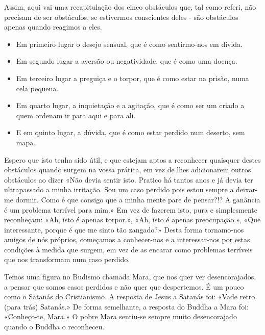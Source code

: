 Assim, aqui vai uma recapitulação dos cinco obstáculos que, tal como
referi, não precisam de ser obstáculos, se estivermos conscientes deles
- são obstáculos apenas quando reagimos a eles.


\begin{itemize}
  \item Em primeiro lugar o desejo sensual, que é como sentirmo-nos em dívida.
  \item Em segundo lugar a aversão ou negatividade, que é como uma doença.
  \item Em terceiro lugar a preguiça e o torpor, que é como estar na prisão, numa cela pequena.
  \item Em quarto lugar, a inquietação e a agitação, que é como ser um criado a quem ordenam ir para aqui e para ali.
  \item E em quinto lugar, a dúvida, que é como estar perdido num deserto, sem mapa.
\end{itemize}

Espero que isto tenha sido útil, e que estejam aptos a reconhecer
quaisquer destes obstáculos quando surgem na vossa prática, em vez de
lhes adicionarem outros obstáculos ao dizer «Não devia sentir isto.
Pratico há tantos anos e já devia ter ultrapassado a minha irritação.
Sou um caso perdido pois estou sempre a deixar-me dormir. Como é que
consigo que a minha mente pare de pensar?!? A ganância é um problema
terrível para mim.» Em vez de fazerem isto, pura e simplesmente
reconheçam: «Ah, isto é apenas torpor.», «Ah, isto é apenas
preocupação.», «Que interessante, porque é que me sinto tão zangado?»
Desta forma tornamo-nos amigos de nós próprios, começamos a conhecer-nos
e a interessar-nos por estas condições à medida que surgem, em vez de as
encarar como problemas terríveis que nos transformam num caso perdido.

Temos uma figura no Budismo chamada Mara, que nos quer ver
desencorajados, a pensar que somos casos perdidos e não quer que
despertemos. É um pouco como o Satanás do Cristianismo. A resposta de
Jesus a Satanás foi: «Vade retro (para trás) Satanás.» De forma
semelhante, a resposta do Buddha a Mara foi: «Conheço-te, Mara.» O pobre
Mara sentiu-se sempre muito desencorajado quando o Buddha o reconheceu.

